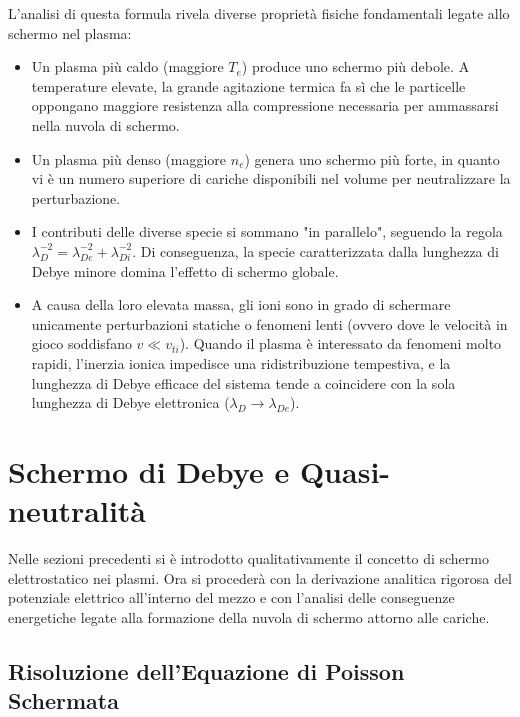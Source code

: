 L'analisi di questa formula rivela diverse proprietà fisiche fondamentali legate allo schermo nel plasma:
\begin{itemize}
\item Un plasma più caldo (maggiore $T_e$) produce uno schermo più debole. A temperature elevate, la grande agitazione termica fa sì che le particelle oppongano maggiore resistenza alla compressione necessaria per ammassarsi nella nuvola di schermo.
\item Un plasma più denso (maggiore $n_e$) genera uno schermo più forte, in quanto vi è un numero superiore di cariche disponibili nel volume per neutralizzare la perturbazione.
\item I contributi delle diverse specie si sommano "in parallelo", seguendo la regola $\lambda_D^{-2} = \lambda_{De}^{-2} + \lambda_{Di}^{-2}$. Di conseguenza, la specie caratterizzata dalla lunghezza di Debye minore domina l'effetto di schermo globale.
\item A causa della loro elevata massa, gli ioni sono in grado di schermare unicamente perturbazioni statiche o fenomeni lenti (ovvero dove le velocità in gioco soddisfano $v \ll v_{ti}$). Quando il plasma è interessato da fenomeni molto rapidi, l'inerzia ionica impedisce una ridistribuzione tempestiva, e la lunghezza di Debye efficace del sistema tende a coincidere con la sola lunghezza di Debye elettronica ($\lambda_D \to \lambda_{De}$).
\end{itemize}

\section{Schermo di Debye e Quasi-neutralità}

Nelle sezioni precedenti si è introdotto qualitativamente il concetto di schermo elettrostatico nei plasmi. Ora si procederà con la derivazione analitica rigorosa del potenziale elettrico all'interno del mezzo e con l'analisi delle conseguenze energetiche legate alla formazione della nuvola di schermo attorno alle cariche.

\subsection{Risoluzione dell'Equazione di Poisson Schermata}

